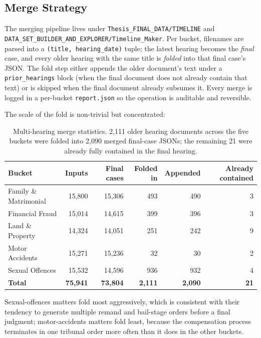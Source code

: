 \subsection{Merge Strategy}

The merging pipeline lives under
\texttt{Thesis\_FINAL\_DATA/TIMELINE} and
\texttt{DATA\_SET\_BUILDER\_AND\_EXPLORER/Timeline\_Maker}. Per bucket,
filenames are parsed into a \texttt{(title,\ hearing\_date)} tuple; the
latest hearing becomes the \emph{final} case, and every older hearing
with the same title is \emph{folded} into that final case's JSON. The
fold step either appends the older document's text under a
\texttt{prior\_hearings} block (when the final document does not
already contain that text) or is skipped when the final document
already subsumes it. Every merge is logged in a per-bucket
\texttt{report.json} so the operation is auditable and reversible.

The scale of the fold is non-trivial but concentrated:

\begin{table}[H]
  \centering
  \small
  \begin{tabular}{lrrrrr}
    \toprule
    Bucket & Inputs & Final cases & Folded in & Appended & Already contained \\
    \midrule
    Family \& Matrimonial & 15{,}800 & 15{,}306 & 493 & 490 & 3 \\
    Financial Fraud & 15{,}014 & 14{,}615 & 399 & 396 & 3 \\
    Land \& Property & 14{,}324 & 14{,}051 & 251 & 242 & 9 \\
    Motor Accidents & 15{,}271 & 15{,}236 & 32 & 30 & 2 \\
    Sexual Offences & 15{,}532 & 14{,}596 & 936 & 932 & 4 \\
    \midrule
    \textbf{Total} & \textbf{75{,}941} & \textbf{73{,}804} & \textbf{2{,}111}
      & \textbf{2{,}090} & \textbf{21} \\
    \bottomrule
  \end{tabular}
  \caption{Multi-hearing merge statistics. 2{,}111 older hearing
  documents across the five buckets were folded into 2{,}090 merged
  final-case JSONs; the remaining 21 were already fully contained in
  the final hearing.}
  \label{tab:merge_stats}
\end{table}

Sexual-offences matters fold most aggressively, which is consistent with
their tendency to generate multiple remand and bail-stage orders before
a final judgment; motor-accidents matters fold least, because the
compensation process terminates in one tribunal order more often than
it does in the other buckets.

